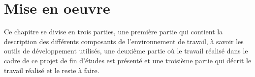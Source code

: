 \chapter{Mise en oeuvre}
Ce chapitre se divise en trois parties, une première partie qui contient la description des différents composants de l’environnement de travail, à savoir les outils de développement utilisés, une deuxième partie où le travail réalisé dans le cadre de ce projet de fin d’études est présenté et une troisième partie qui décrit le travail réalisé et le reste à faire.



